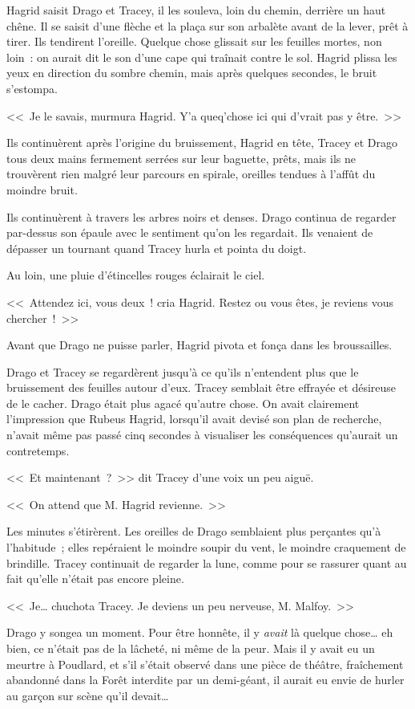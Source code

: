 Hagrid saisit Drago et Tracey, il les souleva, loin du chemin, derrière un haut chêne. Il se saisit d'une flèche et la plaça sur son arbalète avant de la lever, prêt à tirer. Ils tendirent l'oreille. Quelque chose glissait sur les feuilles mortes, non loin~: on aurait dit le son d'une cape qui traînait contre le sol. Hagrid plissa les yeux en direction du sombre chemin, mais après quelques secondes, le bruit s'estompa.

<<~Je le savais, murmura Hagrid. Y'a queq'chose ici qui d'vrait pas y être.~>>

Ils continuèrent après l'origine du bruissement, Hagrid en tête, Tracey et Drago tous deux mains fermement serrées sur leur baguette, prêts, mais ils ne trouvèrent rien malgré leur parcours en spirale, oreilles tendues à l'affût du moindre bruit.

Ils continuèrent à travers les arbres noirs et denses. Drago continua de regarder par-dessus son épaule avec le sentiment qu'on les regardait. Ils venaient de dépasser un tournant quand Tracey hurla et pointa du doigt.

Au loin, une pluie d'étincelles rouges éclairait le ciel.

<<~Attendez ici, vous deux~! cria Hagrid. Restez ou vous êtes, je reviens vous chercher~!~>>

Avant que Drago ne puisse parler, Hagrid pivota et fonça dans les broussailles.

Drago et Tracey se regardèrent jusqu'à ce qu'ils n'entendent plus que le bruissement des feuilles autour d'eux. Tracey semblait être effrayée et désireuse de le cacher. Drago était plus agacé qu'autre chose. On avait clairement l'impression que Rubeus Hagrid, lorsqu'il avait devisé son plan de recherche, n'avait même pas passé cinq secondes à visualiser les conséquences qu'aurait un contretemps.

<<~Et maintenant~?~>> dit Tracey d'une voix un peu aiguë.

<<~On attend que M. Hagrid revienne.~>>

Les minutes s'étirèrent. Les oreilles de Drago semblaient plus perçantes qu'à l'habitude~; elles repéraient le moindre soupir du vent, le moindre craquement de brindille. Tracey continuait de regarder la lune, comme pour se rassurer quant au fait qu'elle n'était pas encore pleine.

<<~Je… chuchota Tracey. Je deviens un peu nerveuse, M. Malfoy.~>>

Drago y songea un moment. Pour être honnête, il y \emph{avait} là quelque chose… eh bien, ce n'était pas de la lâcheté, ni même de la peur. Mais il y avait eu un meurtre à Poudlard, et s'il s'était observé dans une pièce de théâtre, fraîchement abandonné dans la Forêt interdite par un demi-géant, il aurait eu envie de hurler au garçon sur scène qu'il devait…

